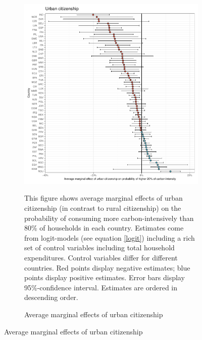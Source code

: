 \begin{figure}[ht!]\ContinuedFloat
   \centering
   \begin{subfigure}[b]{\textwidth}
   \centering
   \caption{Average marginal effects of urban citizenship} \label{fig:Logit_ME_urban}
   \includegraphics{1_Figures/Analysis_Logit_Models_Marginal_Effects/Average_Marginal_Effects_affected_upper_80_urban_01_2017B.pdf}
   \begin{subcaption2}
     This figure shows average marginal effects of urban citizenship (in contrast to rural citizenship) on the probability of consuming more carbon-intensively than 80\% of households in each country. Estimates come from logit-models (see equation \ref{logit}) including a rich set of control variables including total household expenditures. Control variables differ for different countries. Red points display negative estimates; blue points display positive estimates. Error bars display 95\%-confidence interval. Estimates are ordered in descending order.
   \end{subcaption2}
   \end{subfigure}
 \end{figure}
 \clearpage

